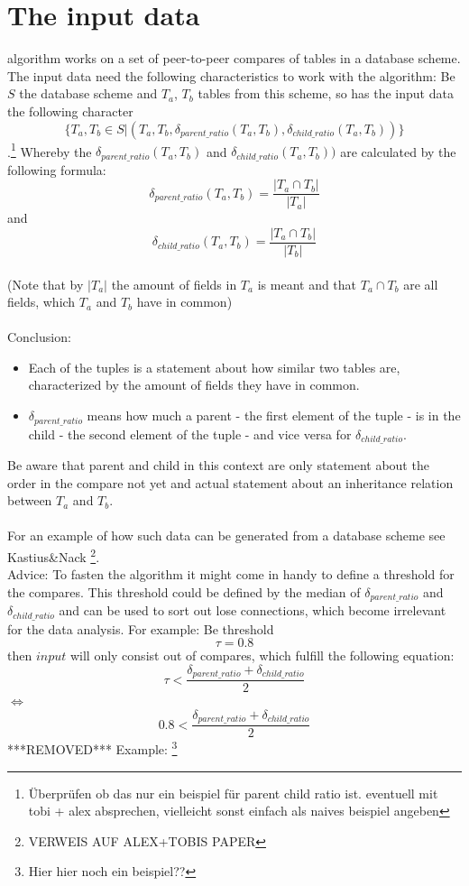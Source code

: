 \documentclass[10pt, journal, twocolumn]{IEEEtran}
\begin{document}
\section{The input data}
 algorithm works on a set of peer-to-peer compares of tables in a database scheme. The input data need the following characteristics to work with the algorithm: Be $S$ the database scheme and $T_a$, $T_b$ tables from this scheme, so has the input data the following character 
$$\{T_a, T_b \in S | (T_a, T_b, \delta_{parent\_ratio}(T_a, T_b),\delta_{child\_ratio}(T_a, T_b))\}$$\hspace{-300cm} 
.\footnote{Überprüfen ob das nur ein beispiel für parent child ratio ist. eventuell mit tobi + alex absprechen, vielleicht sonst einfach als naives beispiel angeben} Whereby the $\delta_{parent\_ratio}(T_a, T_b)$ and $\delta_{child\_ratio}(T_a, T_b))$ are calculated by the following formula: $$\delta_{parent\_ratio}(T_a, T_b) = \frac{ | T_a \cap T_b |}{ | T_a |} $$ and  $$\delta_{child\_ratio}(T_a, T_b) = \frac{ | T_a \cap T_b |}{ | T_b |} $$\\
(Note that by $| T_a |$ the amount of fields in $T_a$ is meant and that $T_a \cap T_b$ are all fields, which $T_a$ and $T_b$ have in common)\\
\\Conclusion:
\begin{itemize}
\item Each of the tuples is a statement about how similar two tables are, characterized by the amount of fields they have in common. 
\item $\delta_{parent\_ratio}$ means how much a parent - the first element of the tuple - is in the child - the second element of the tuple - and vice versa for $\delta_{child\_ratio}$.
\end{itemize}
Be aware that parent and child in this context are only statement about the order in the compare not yet and actual statement about an inheritance relation between $T_a$ and $T_b$.\\
\\For an example of how such data can be generated from a database scheme see Kastius\&Nack \footnote{VERWEIS AUF ALEX+TOBIS PAPER}.\\
Advice: To fasten the algorithm it might come in handy to define a threshold for the compares. This threshold could be defined by the median of $\delta_{parent\_ratio}$ and $\delta_{child\_ratio}$ and can be used to sort out lose connections, which become irrelevant for the data analysis. For example: Be threshold $$ \tau = 0.8$$ then $input$ will only consist out of compares, which fulfill the following equation: $$ \tau < \frac{\delta_{parent\_ratio} +  \delta_{child\_ratio}}{2} $$ $\Leftrightarrow$ $$0.8 < \frac{\delta_{parent\_ratio} +  \delta_{child\_ratio}}{2} $$
***REMOVED***
Example: \footnote{Hier hier noch ein beispiel??}
\end{document}

